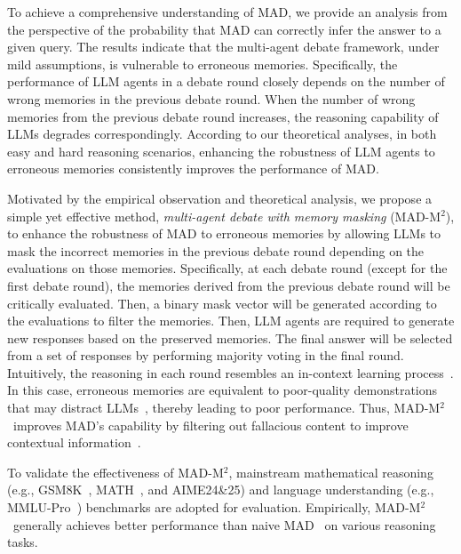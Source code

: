\documentclass{article} %
\newcommand{\methodname}{MAD-M$^2$}
\theoremstyle{plain}
\begin{document}

To achieve a comprehensive understanding of MAD, we provide an analysis from the perspective of the probability that MAD can correctly infer the answer to a given query. The results indicate that the multi-agent debate framework, under mild assumptions, is vulnerable to erroneous memories. Specifically, the performance of LLM agents in a debate round closely depends on the number of wrong memories in the previous debate round. When the number of wrong memories from the previous debate round increases, the reasoning capability of LLMs degrades correspondingly. According to our theoretical analyses, in both easy and hard reasoning scenarios, enhancing the robustness of LLM agents to erroneous memories consistently improves the performance of MAD.

Motivated by the empirical observation and theoretical analysis, we propose a simple yet effective method, \textit{multi-agent debate with memory masking} (\methodname), to enhance the robustness of MAD to erroneous memories by allowing LLMs to mask the incorrect memories in the previous debate round depending on the evaluations on those memories. Specifically, at each debate round (except for the first debate round), the memories derived from the previous debate round will be critically evaluated. Then, a binary mask vector will be generated according to the evaluations to filter the memories. Then, LLM agents are required to generate new responses based on the preserved memories. The final answer will be selected from a set of responses by performing majority voting in the final round. 
Intuitively, the reasoning in each round resembles an in-context learning process~\citep{wei2022emergent}. In this case, erroneous memories are equivalent to poor-quality demonstrations that may distract LLMs~\citep{shi2023large}, thereby leading to poor performance. Thus, \methodname\ improves MAD's capability by filtering out fallacious content to improve contextual information~\citep{mei2025survey}.


To validate the effectiveness of \methodname, mainstream mathematical reasoning (e.g., GSM8K~\citep{gsm8k_dataset}, MATH~\citep{math_dataset}, and AIME24\&25) and language understanding (e.g., MMLU-Pro~\citep{wang2024mmlu}) benchmarks are adopted for evaluation. Empirically, \methodname\ generally achieves better performance than naive MAD~\citep{mad_yilun} on various reasoning tasks. %
\end{document}
